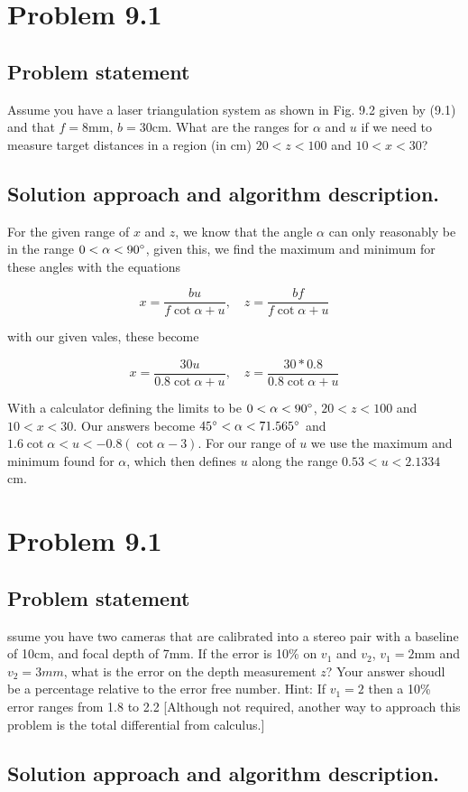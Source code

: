 \documentclass[letterpaper,11pt]{texMemo} %
\begin{document}
\newpage
\section*{Problem 9.1}
\subsection*{Problem statement}
Assume you have a laser triangulation system as shown in Fig. 9.2 given by (9.1) and that $f  = 8$mm,
$b=30$cm. What are the ranges for $\alpha$ and $u$ if we need to measure target distances in a region
(in cm) $20 < z < 100$ and $10<x<30$?

\subsection*{Solution approach and algorithm description.}

For the given range of $x$ and $z$, we know that the angle $\alpha$ can only reasonably be in the range
$0<\alpha<90\degree$, given this, we find the maximum and minimum for these angles with the equations

\[
    x = \frac{b u}{f\cot \alpha + u},  \quad
z = \frac{b f}{f\cot \alpha + u}
\]

with our given vales, these become

\[
    x = \frac{30 u}{0.8\cot \alpha + u},  \quad
z = \frac{30 * 0.8}{0.8\cot \alpha + u}
\]

With a calculator defining the limits to be $0<\alpha<90\degree$, $20 < z < 100$ and $10<x<30$. Our answers become 
$45\degree<\alpha<71.565\degree$ and $1.6\cot \alpha < u < -0.8(\cot \alpha - 3)$. For our range of $u$ we use the
maximum and minimum found for $\alpha$, which then defines $u$ along the range $0.53<u<2.1334$ cm.

\newpage
\section*{Problem 9.1}
\subsection*{Problem statement}
ssume you have two cameras that are calibrated into a stereo pair with a baseline of 10cm, and focal depth of 7mm. If the error is 10\% 
on $v_1$ and $v_2$, $v_1=2$mm and $v_2=3mm$, what is the error on the depth measurement $z$? Your answer shoudl be a percentage relative 
to the error free number. Hint: If $v_1=2$ then a 10\% error ranges from 1.8 to 2.2 [Although not required, another way to approach this problem is the total differential from calculus.]

\subsection*{Solution approach and algorithm description.}
\end{document}
